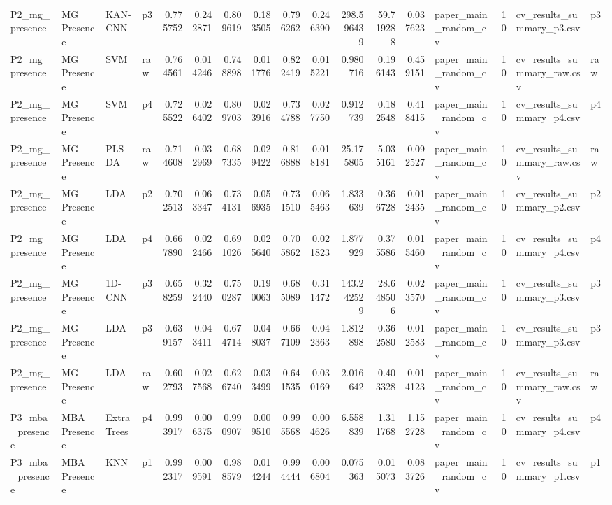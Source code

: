 \begin{tabular}{llllrrrrrrrrrlrll}
P2_mg_presence & MG Presence & KAN-CNN & p3 & 0.775752 & 0.242871 & 0.809619 & 0.183505 & 0.796262 & 0.246390 & 298.596439 & 59.719288 & 0.037623 & paper_main_random_cv & 10 & cv_results_summary_p3.csv & p3 \\
P2_mg_presence & MG Presence & SVM & raw & 0.764561 & 0.014246 & 0.748898 & 0.011776 & 0.822419 & 0.015221 & 0.980716 & 0.196143 & 0.459151 & paper_main_random_cv & 10 & cv_results_summary_raw.csv & raw \\
P2_mg_presence & MG Presence & SVM & p4 & 0.725522 & 0.026402 & 0.809703 & 0.023916 & 0.734788 & 0.027750 & 0.912739 & 0.182548 & 0.418415 & paper_main_random_cv & 10 & cv_results_summary_p4.csv & p4 \\
P2_mg_presence & MG Presence & PLS-DA & raw & 0.714608 & 0.032969 & 0.687335 & 0.029422 & 0.816888 & 0.018181 & 25.175805 & 5.035161 & 0.092527 & paper_main_random_cv & 10 & cv_results_summary_raw.csv & raw \\
P2_mg_presence & MG Presence & LDA & p2 & 0.702513 & 0.063347 & 0.734131 & 0.056935 & 0.731510 & 0.065463 & 1.833639 & 0.366728 & 0.012435 & paper_main_random_cv & 10 & cv_results_summary_p2.csv & p2 \\
P2_mg_presence & MG Presence & LDA & p4 & 0.667890 & 0.022466 & 0.691026 & 0.025640 & 0.705862 & 0.021823 & 1.877929 & 0.375586 & 0.015460 & paper_main_random_cv & 10 & cv_results_summary_p4.csv & p4 \\
P2_mg_presence & MG Presence & 1D-CNN & p3 & 0.658259 & 0.322440 & 0.750287 & 0.190063 & 0.685089 & 0.311472 & 143.242529 & 28.648506 & 0.023570 & paper_main_random_cv & 10 & cv_results_summary_p3.csv & p3 \\
P2_mg_presence & MG Presence & LDA & p3 & 0.639157 & 0.043411 & 0.674714 & 0.048037 & 0.667109 & 0.042363 & 1.812898 & 0.362580 & 0.012583 & paper_main_random_cv & 10 & cv_results_summary_p3.csv & p3 \\
P2_mg_presence & MG Presence & LDA & raw & 0.602793 & 0.027568 & 0.626740 & 0.033499 & 0.641535 & 0.030169 & 2.016642 & 0.403328 & 0.014123 & paper_main_random_cv & 10 & cv_results_summary_raw.csv & raw \\
P3_mba_presence & MBA Presence & ExtraTrees & p4 & 0.993917 & 0.006375 & 0.990907 & 0.009510 & 0.995568 & 0.004626 & 6.558839 & 1.311768 & 1.152728 & paper_main_random_cv & 10 & cv_results_summary_p4.csv & p4 \\
P3_mba_presence & MBA Presence & KNN & p1 & 0.992317 & 0.009591 & 0.988579 & 0.014244 & 0.994444 & 0.006804 & 0.075363 & 0.015073 & 0.083726 & paper_main_random_cv & 10 & cv_results_summary_p1.csv & p1 \\

\end{tabular}
